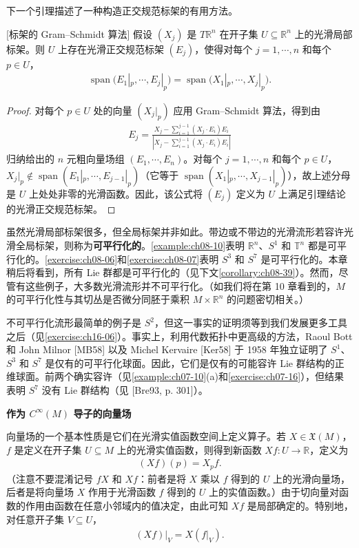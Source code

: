\documentclass[../../main.tex]{subfiles}
\begin{document}
下一个引理描述了一种构造正交规范标架的有用方法。

\begin{lemma}\label{lemma:ch08-13}[标架的 Gram--Schmidt 算法]
假设 $(X_j)$ 是 $T\mathbb{R}^n$ 在开子集 $U\subseteq\mathbb{R}^n$ 上的光滑局部标架。则 $U$ 上存在光滑正交规范标架 $(E_j)$，使得对每个 $j=1,\cdots ,n$ 和每个 $p\in U$，
\begin{align*}
\operatorname{span}\bigl(E_1|_p,\cdots ,E_j|_p\bigr)=\operatorname{span}\bigl(X_1|_p,\cdots ,X_j|_p\bigr).
\end{align*}
\end{lemma}

\begin{proof}
对每个 $p\in U$ 处的向量 $(X_j|_p)$ 应用 Gram--Schmidt 算法，得到由
\begin{align*}
E_j=\frac{X_j-\sum_{i=1}^{j-1}(X_j\cdot E_i)E_i}{\left|X_j-\sum_{i=1}^{j-1}(X_j\cdot E_i)E_i\right|}
\end{align*}
归纳给出的 $n$ 元粗向量场组 $(E_1,\cdots ,E_n)$。对每个 $j=1,\cdots ,n$ 和每个 $p\in U$，$X_j|_p\notin\operatorname{span}(E_1|_p,\cdots ,E_{j-1}|_p)$（它等于 $\operatorname{span}(X_1|_p,\cdots ,X_{j-1}|_p)$），故上述分母是 $U$ 上处处非零的光滑函数。因此，该公式将 $(E_j)$ 定义为 $U$ 上满足引理结论的光滑正交规范标架。
\end{proof}

虽然光滑局部标架很多，但全局标架并非如此。带边或不带边的光滑流形若容许光滑全局标架，则称为\textbf{可平行化的}。\cref{example:ch08-10}表明 $\mathbb{R}^n$、$S^1$ 和 $\mathbb{T}^n$ 都是可平行化的。\cref{exercise:ch08-06}和\cref{exercise:ch08-07}表明 $S^3$ 和 $S^7$ 是可平行化的。本章稍后将看到，所有 Lie 群都是可平行化的（见下文\cref{corollary:ch08-39}）。然而，尽管有这些例子，大多数光滑流形并不可平行化。（如我们将在第 10 章看到的，$M$ 的可平行化性与其切丛是否微分同胚于乘积 $M\times\mathbb{R}^n$ 的问题密切相关。）

不可平行化流形最简单的例子是 $S^2$，但这一事实的证明须等到我们发展更多工具之后（见\cref{exercise:ch16-06}）。事实上，利用代数拓扑中更高级的方法，Raoul Bott 和 John Milnor [MB58] 以及 Michel Kervaire [Ker58] 于 1958 年独立证明了 $S^1$、$S^3$ 和 $S^7$ 是仅有的可平行化球面。因此，它们是仅有的可能容许 Lie 群结构的正维球面。前两个确实容许（见\cref{example:ch07-10}(a)和\cref{exercise:ch07-16}），但结果表明 $S^7$ 没有 Lie 群结构（见 [Bre93, p. 301]）。

\textbf{作为 $C^\infty(M)$ 导子的向量场}

向量场的一个基本性质是它们在光滑实值函数空间上定义算子。若 $X\in\mathfrak{X}(M)$，$f$ 是定义在开子集 $U\subseteq M$ 上的光滑实值函数，则得到新函数 $Xf\colon U\to\mathbb{R}$，定义为
\begin{align*}
(Xf)(p)=X_pf.
\end{align*}
（注意不要混淆记号 $fX$ 和 $Xf$：前者是将 $X$ 乘以 $f$ 得到的 $U$ 上的光滑向量场，后者是将向量场 $X$ 作用于光滑函数 $f$ 得到的 $U$ 上的实值函数。）由于切向量对函数的作用由函数在任意小邻域内的值决定，由此可知 $Xf$ 是局部确定的。特别地，对任意开子集 $V\subseteq U$，
\begin{align}
(Xf)|_V=X(f|_V).\label{align:ch08-04}
\end{align}
\end{document}
